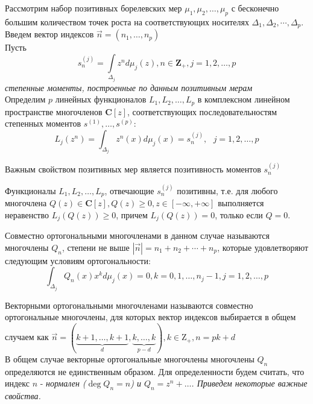 Рассмотрим набор позитивных борелевских мер
$\mu_1,\mu_2,\ldots,\mu_p$ с бесконечно большим количеством точек
роста на соответствующих носителях
$\Delta_1,\Delta_2,\cdots,\Delta_p$. \\
Введем вектор индексов $\overrightarrow{n}=(n_1,\ldots,n_p)$ \\
Пусть
\begin{equation}
\label{Moments} s_n^{(j)}=\int \limits_{\Delta_j} {z^n d\mu_j
(z)}, n \in \textbf{Z}_{+}, j=1,2,\ldots,p
\end{equation}
\textit{степенные моменты, построенные по данным позитивным
мерам} \\
Определим $p$ линейных функционалов $L_1,L_2,\ldots,L_p$ в
комплексном линейном пространстве многочленов $\textbf{C}[z]$,
соответствующих последовательностям степенных моментов ${s^{(1)}},
\ldots, {s^{(p)}}$:
\begin{equation}
\label{Functionals}
L_j(z^n)=\int_{\Delta_j}{z^n(x)d\mu_j(x)}=s_n^{(j)},\mbox{    }
j=1,2,\ldots,p
\end{equation}
\begin{prope}
Важным свойством позитивных мер является позитивность моментов
$s_n^{(j)}$
\end{prope}
\begin{prope}
Функционалы $L_1,L_2,\ldots,L_p$, отвечающие $s_n^{(j)}$
позитивны, т.е. для любого многочлена $Q(z) \in \textbf{C}[z],
Q(z) \geq 0, z \in [-\infty,+\infty]$ выполняется неравенство
$L_j(Q(z)) \geq 0$, причем $L_j(Q(z))=0$, только если $Q = 0$. \rm
\end{prope}
\begin{defi} Совместно ортогональными многочленами \rm в данном
случае называются многочлены $Q_n$, степени не выше
$|\overrightarrow{n}|=n_1+n_2+\cdots+n_p$, которые удовлетворяют
следующим условиям ортогональности:
\begin{equation}
\label{OrthogonalCondition}
\int_{\Delta_j}{Q_n(x)x^kd\mu_j(x)}=0,\mbox{
}k=0,1,\ldots,n_j-1,j=1,2,\ldots,p
\end{equation}
\end{defi}
\begin{defi} Векторными ортогональными многочленами \rm называются
совместно ортогональные многочлены, для которых вектор индексов
выбирается в общем случаем как
$\overrightarrow{n}=(\underbrace{k+1,\ldots,k+1}_{d},\underbrace{k,\ldots,k}_{p-d}),
k\in{\mbox{Z}}_{+},n=pk+d$ \\
В общем случае векторные ортогональные многочлены многочлены $Q_n$
определяются не единственным образом. Для определенности будем
считать, что индекс $n$ - \it нормален \rm ($\deg  Q_n=n$) и
$Q_n=z^n+\ldots$. Приведем некоторые важные свойства.
\end{defi}
